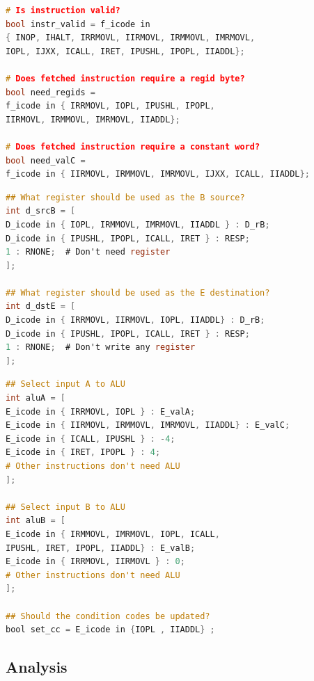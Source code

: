 \documentclass[12pt,a4paper]{article}
\theoremstyle{definition}
\numberwithin{equation}{section}
\numberwithin{figure}{section}
\begin{document}
\begin{lstlisting}[language=C++,title=Fetch Stage]
# Is instruction valid?
bool instr_valid = f_icode in
{ INOP, IHALT, IRRMOVL, IIRMOVL, IRMMOVL, IMRMOVL,
IOPL, IJXX, ICALL, IRET, IPUSHL, IPOPL, IIADDL};

# Does fetched instruction require a regid byte?
bool need_regids =
f_icode in { IRRMOVL, IOPL, IPUSHL, IPOPL,
IIRMOVL, IRMMOVL, IMRMOVL, IIADDL};

# Does fetched instruction require a constant word?
bool need_valC =
f_icode in { IIRMOVL, IRMMOVL, IMRMOVL, IJXX, ICALL, IIADDL};
\end{lstlisting}
\begin{lstlisting}[language=C,title=Decode Stage]
## What register should be used as the B source?
int d_srcB = [
D_icode in { IOPL, IRMMOVL, IMRMOVL, IIADDL } : D_rB;
D_icode in { IPUSHL, IPOPL, ICALL, IRET } : RESP;
1 : RNONE;  # Don't need register
];

## What register should be used as the E destination?
int d_dstE = [
D_icode in { IRRMOVL, IIRMOVL, IOPL, IIADDL} : D_rB;
D_icode in { IPUSHL, IPOPL, ICALL, IRET } : RESP;
1 : RNONE;  # Don't write any register
];
\end{lstlisting}
\begin{lstlisting}[language=C,title=Execute Stage]
## Select input A to ALU
int aluA = [
E_icode in { IRRMOVL, IOPL } : E_valA;
E_icode in { IIRMOVL, IRMMOVL, IMRMOVL, IIADDL} : E_valC;
E_icode in { ICALL, IPUSHL } : -4;
E_icode in { IRET, IPOPL } : 4;
# Other instructions don't need ALU
];

## Select input B to ALU
int aluB = [
E_icode in { IRMMOVL, IMRMOVL, IOPL, ICALL,
IPUSHL, IRET, IPOPL, IIADDL} : E_valB;
E_icode in { IRRMOVL, IIRMOVL } : 0;
# Other instructions don't need ALU
];

## Should the condition codes be updated?
bool set_cc = E_icode in {IOPL , IIADDL} ;
\end{lstlisting}


\subsection{Analysis}
\end{document}
